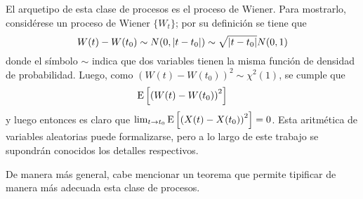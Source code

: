 El arquetipo de esta clase de procesos es el proceso de Wiener.
%
%
%
%
Para mostrarlo, consid\'erese un proceso de Wiener $\{W_t\}$; 
por su definici\'on se tiene que
$$W(t) - W(t_0) \sim N(0,\left| t-t_0 \right|) \sim \sqrt{\left| t-t_0 \right|} N(0,1)$$
donde el s\'imbolo $\sim$ indica que dos variables tienen la misma funci\'on de densidad de 
probabilidad. Luego, como $ \left( W(t) - W(t_0) \right)^{2} \sim \chi^{2}(1) $, se cumple que
$$
\mathrm{E}\left[ \left( W(t) - W(t_0) \right)^{2} \right]
$$
y luego entonces es claro que $\lim_{t \rightarrow t_0} \mathrm{E}\left[ \left( X(t) - X(t_0) \right)^{2} \right] = 0$.
Esta aritm\'etica de variables aleatorias puede formalizarse, pero a lo largo de
este trabajo se supondr\'an conocidos los detalles respectivos.

De manera m\'as general, cabe mencionar un teorema que permite tipificar de manera m\'as
adecuada esta clase de procesos.

